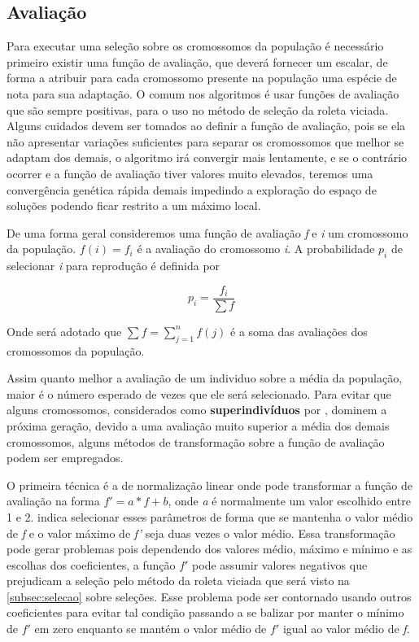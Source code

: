 \subsection{Avaliação}
Para executar uma seleção sobre os cromossomos da população é necessário primeiro existir uma função de avaliação, que deverá fornecer um escalar, de forma a atribuir para cada cromossomo presente na população uma espécie de nota para sua adaptação. O comum nos algoritmos é usar funções de avaliação que são sempre positivas, para o uso no método de seleção da roleta viciada. Alguns cuidados devem ser tomados ao definir a função de avaliação, pois se ela não apresentar variações suficientes para separar os cromossomos que melhor se adaptam dos demais, o algoritmo irá convergir mais lentamente, e se o contrário ocorrer e a função de avaliação tiver valores muito elevados, teremos uma convergência genética rápida demais impedindo a exploração do espaço de soluções podendo ficar restrito a um máximo local.

De uma forma geral consideremos uma função de avaliação \textit{f} e \textit{i} um cromossomo da população. \(f(i) = f_i\) é a avaliação do cromossomo \textit{i}. A probabilidade \(p_i\) de selecionar \textit{i} para reprodução é definida por 

\[p_i = \frac{f_i}{\sum{f}}\]

Onde será adotado que \(\sum{f} = \sum\limits_{j=1}^n {f(j)}\) é a soma das avaliações dos cromossomos da população.

Assim quanto melhor a avaliação de um individuo sobre a média da população, maior é o número esperado de vezes que ele será selecionado. Para evitar que alguns cromossomos, considerados como \textbf{superindivíduos} por \citeauthor{Linden2008}, dominem a próxima geração, devido a uma avaliação muito superior a média dos demais cromossomos, alguns métodos de transformação sobre a função de avaliação podem ser empregados. 

O primeira técnica é a de normalização linear onde pode transformar a função de avaliação na forma \( f' = a * f + b\), onde \textit{a} é normalmente um valor escolhido entre 1 e 2. \citeauthor{Goldberg1989} indica selecionar esses parâmetros de forma que se mantenha o valor médio de \textit{f} e o valor máximo de \textit{f'} seja duas vezes o valor médio. Essa transformação pode gerar problemas pois  dependendo dos valores médio, máximo e mínimo e as escolhas dos coeficientes, a função \(f'\) pode assumir valores negativos que prejudicam a seleção pelo método da roleta viciada que será visto na \autoref{subsec:selecao} sobre seleções. Esse problema pode ser contornado usando outros coeficientes para evitar tal condição passando a se balizar por manter o mínimo de \(f'\) em zero enquanto se mantém o valor médio de \(f'\) igual ao valor médio de \textit{f}.

